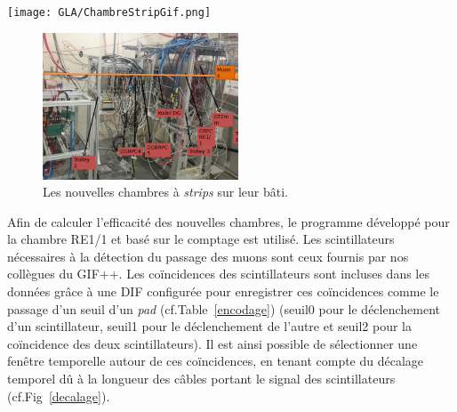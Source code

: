 \marginpar
{
	\centering
	\texttt{[image: GLA/ChambreStripGif.png]}
	\captionsetup{type=figure}\caption{Nouvelle chambre \SI{32}{\centi\meter}$\times$\SI{30}{\centi\meter}.}
	\label{nouvellestrip}
}
\vspace*{-0.2cm}
\begin{figure}[ht!]
	\centering
	\includegraphics[width=0.52\textwidth]{GLA/setup.png}
	\captionsetup{type=figure}\caption{Les nouvelles chambres à \textit{strips} sur leur bâti.}
	\label{bati}
\end{figure}
\vspace*{-0.2cm}
Afin de calculer l'efficacité des nouvelles chambres, le programme développé pour la chambre RE1/1 et basé sur le comptage est utilisé. Les scintillateurs nécessaires à la détection du passage des muons sont ceux fournis par nos collègues du GIF++. Les coïncidences des scintillateurs sont incluses dans les données grâce à une DIF configurée pour enregistrer ces coïncidences comme le passage d'un seuil d'un \textit{pad} (cf.Table~\ref{encodage}) (seuil0 pour le déclenchement d'un scintillateur, seuil1 pour le déclenchement de l'autre et seuil2 pour la coïncidence des deux scintillateurs). Il est ainsi possible de sélectionner une fenêtre temporelle autour de ces coïncidences, en tenant compte du décalage temporel dû à la longueur des câbles portant le signal des scintillateurs (cf.Fig~\ref{decalage}). 

